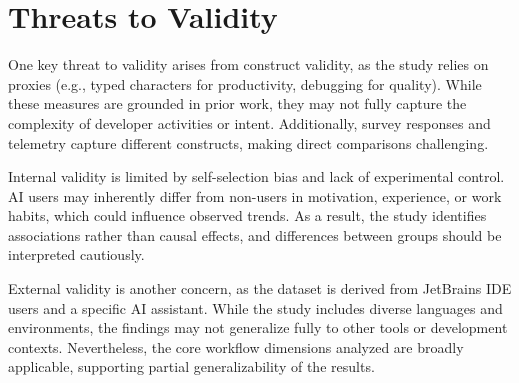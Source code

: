 \section{Threats to Validity}
One key threat to validity arises from construct validity, as the study relies on proxies (e.g., typed characters for productivity, debugging for quality). While these measures are grounded in prior work, they may not fully capture the complexity of developer activities or intent. Additionally, survey responses and telemetry capture different constructs, making direct comparisons challenging.

Internal validity is limited by self-selection bias and lack of experimental control. AI users may inherently differ from non-users in motivation, experience, or work habits, which could influence observed trends. As a result, the study identifies associations rather than causal effects, and differences between groups should be interpreted cautiously.

External validity is another concern, as the dataset is derived from JetBrains IDE users and a specific AI assistant. While the study includes diverse languages and environments, the findings may not generalize fully to other tools or development contexts. Nevertheless, the core workflow dimensions analyzed are broadly applicable, supporting partial generalizability of the results.
